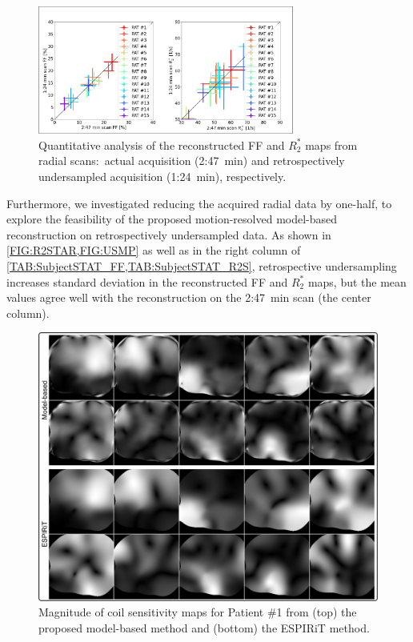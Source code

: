 \documentclass[journal,twoside,web]{ieeecolor}
\begin{document}
\begin{figure}
	\centering
	\includegraphics[width=0.75\textwidth]{../../figures/tan12.pdf}
	\caption{Quantitative analysis of the reconstructed FF and $R_2^*$ maps 
		from radial scans:~actual acquisition (2:47~\si{\minute}) and 
		retrospectively undersampled acquisition (1:24~\si{\minute}), 
		respectively.}
	\label{FIG:USMP}
\end{figure}

Furthermore, we investigated reducing the acquired radial data by one-half, 
to explore the feasibility of the proposed motion-resolved model-based reconstruction 
on retrospectively undersampled data. 
As shown in \cref{FIG:R2STAR,FIG:USMP} as well as in the right column of 
\cref{TAB:SubjectSTAT_FF,TAB:SubjectSTAT_R2S}, retrospective undersampling 
increases standard deviation in the reconstructed FF and $R_2^*$ maps, 
but the mean values agree well with the reconstruction on the 2:47~min scan (the center column).


\begin{figure}
	\centering
	\includegraphics[width=\columnwidth]{../../figures/tan13.pdf}
	\caption{Magnitude of coil sensitivity maps for Patient \#1 from 
		(top) the proposed model-based method and (bottom) the ESPIRiT method.}
	\label{FIG:SENS}
\end{figure}
\end{document}
